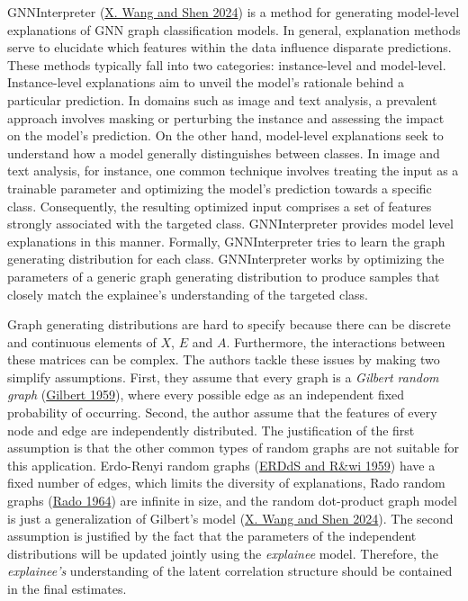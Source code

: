 \documentclass[
  11pt,
  letterpaper,
]{article}
\begin{document}
\quad GNNInterpreter (\protect\hyperlink{ref-Wang_Shen_2024}{X. Wang and
Shen 2024}) is a method for generating model-level explanations of GNN
graph classification models. In general, explanation methods serve to
elucidate which features within the data influence disparate
predictions. These methods typically fall into two categories:
instance-level and model-level. Instance-level explanations aim to
unveil the model's rationale behind a particular prediction. In domains
such as image and text analysis, a prevalent approach involves masking
or perturbing the instance and assessing the impact on the model's
prediction. On the other hand, model-level explanations seek to
understand how a model generally distinguishes between classes. In image
and text analysis, for instance, one common technique involves treating
the input as a trainable parameter and optimizing the model's prediction
towards a specific class. Consequently, the resulting optimized input
comprises a set of features strongly associated with the targeted class.
GNNInterpreter provides model level explanations in this manner.
Formally, GNNInterpreter tries to learn the graph generating
distribution for each class. GNNInterpreter works by optimizing the
parameters of a generic graph generating distribution to produce samples
that closely match the explainee's understanding of the targeted class.

\quad Graph generating distributions are hard to specify because there
can be discrete and continuous elements of \(X\), \(E\) and \(A\).
Furthermore, the interactions between these matrices can be complex. The
authors tackle these issues by making two simplify assumptions. First,
they assume that every graph is a \emph{Gilbert random graph}
(\protect\hyperlink{ref-Gilbert_1959}{Gilbert 1959}), where every
possible edge as an independent fixed probability of occurring. Second,
the author assume that the features of every node and edge are
independently distributed. The justification of the first assumption is
that the other common types of random graphs are not suitable for this
application. Erdo-Renyi random graphs
(\protect\hyperlink{ref-erdds1959random}{ERDdS and R\&wi 1959}) have a
fixed number of edges, which limits the diversity of explanations, Rado
random graphs (\protect\hyperlink{ref-Rado1964UniversalGA}{Rado 1964})
are infinite in size, and the random dot-product graph model is just a
generalization of Gilbert's model
(\protect\hyperlink{ref-Wang_Shen_2024}{X. Wang and Shen 2024}). The
second assumption is justified by the fact that the parameters of the
independent distributions will be updated jointly using the
\emph{explainee} model. Therefore, the \emph{explainee's} understanding
of the latent correlation structure should be contained in the final
estimates.
\end{document}

